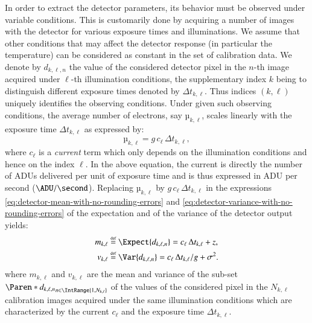 \documentclass{aa}
\newcommand*{\bydef}{\stackrel{{\scriptscriptstyle \text{def}}}{=}}
\newcommand*{\V}[1]{\boldsymbol{#1}}   %
\newcommand*{\TransposeLetter}{\top}
\newcommand*{\T}{^{\TransposeLetter}}
\begin{document}
In order to extract the detector parameters, its behavior must be observed
under variable conditions.  This is customarily done by acquiring a number of
images with the detector for various exposure times and illuminations.  We
assume that other conditions that may affect the detector response (in
particular the temperature) can be considered as constant in the set of
calibration data.  We denote by $d_{k,\ell,n}$ the value of the considered
detector pixel in the $n$-th image acquired under $\ell$-th illumination
conditions, the supplementary index $k$ being to distinguish different exposure
times denoted by $\Delta t_{k,\ell}$.  Thus indices $(k,\ell)$ uniquely
identifies the observing conditions.  Under given such observing conditions,
the average number of electrons, say $µ_{k,\ell}$, scales linearly with the
exposure time $\Delta t_{k,\ell}$ as expressed by:
\begin{equation}
  \label{eq:temporal-behavior}
  µ_{k,\ell} = g\,c_{\ell}\,\Delta t_{k,\ell},
\end{equation}
where $c_{\ell}$ is a \emph{current} term which only depends on the
illumination conditions and hence on the index $\ell$.  In the above equation,
the current is directly the number of ADUs delivered per unit of exposure time
and is thus expressed in ADU per second ($\ADU/\second$).  Replacing
$µ_{k,\ell}$ by $g\,c_{\ell}\,\Delta t_{k,\ell}$ in the expressions
\eqref{eq:detector-mean-with-no-rounding-errors} and
\eqref{eq:detector-variance-with-no-rounding-errors} of the expectation and of
the variance of the detector output yields:
\begin{subequations}
\label{eq:assumed-statistics}
\begin{align}
  \label{eq:assumed-expectation}
  m_{k,\ell} &\bydef \Expect{d_{k,\ell,n}}
               = c_{\ell}\,\Delta t_{k,\ell} + z,\\
  \label{eq:assumed-variance}
  v_{k,\ell} &\bydef \Var{d_{k,\ell,n}}
               = c_{\ell}\,\Delta t_{k,\ell}/g + \sigma^2.
\end{align}
\end{subequations}
where $m_{k,\ell}$ and $v_{k,\ell}$ are the mean and variance of the sub-set
$\Paren*{d_{k,\ell,n}}_{n\in\IntRange{1,N_{k,\ell}}}$ of the values of the
considered pixel in the $N_{k,\ell}$ calibration images acquired under the same
illumination conditions which are characterized by the current $c_\ell$ and the
exposure time $\Delta t_{k,\ell}$.
\end{document}
